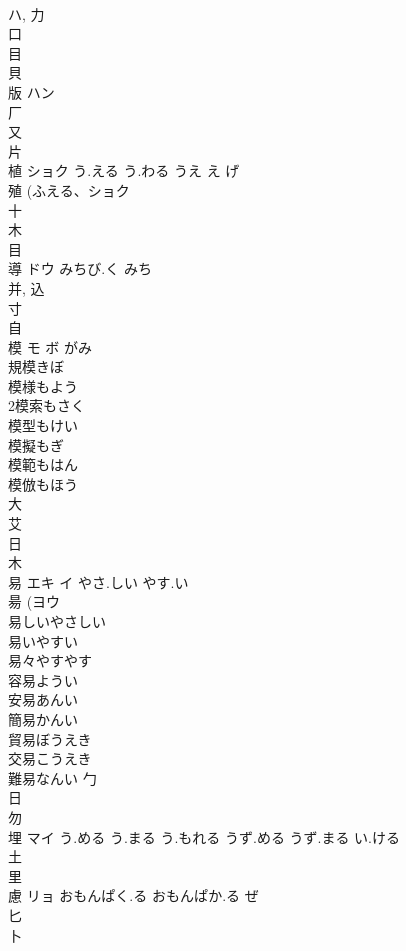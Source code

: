 \documentclass[8pt]{extreport}
\begin{document}
\begin{CJK}{UTF8}{min}
\\	ハ, 力 
\\	口 
\\	目 
\\	貝 
\\	版	ハン		
\\	厂 
\\	又 
\\	片 
\\	植	ショク	う.える う.わる うえ え げ	
\\	殖 (ふえる、ショク 
\\	十 
\\	木 
\\	目 
\\	導	ドウ	みちび.く みち	
\\	并, 込 
\\	寸 
\\	自 
\\	模	モ ボ	がみ	
\\	規模きぼ
\\	模様もよう
\\	2模索もさく
\\	模型もけい
\\	模擬もぎ
\\	模範もはん
\\	模倣もほう
\\	大 
\\	艾 
\\	日 
\\	木 
\\	易	エキ イ	やさ.しい やす.い	
\\	昜 (ヨウ 
\\	易しいやさしい 
\\	易いやすい 
\\	易々やすやす 
\\	容易ようい 
\\	安易あんい 
\\	簡易かんい 
\\	貿易ぼうえき 
\\	交易こうえき 
\\	難易なんい	勹 
\\	日 
\\	勿 
\\	埋	マイ	う.める う.まる う.もれる うず.める うず.まる い.ける	
\\	土 
\\	里 
\\	慮	リョ	おもんぱく.る おもんぱか.る ぜ	
\\	匕 
\\	卜 

\end{CJK}
\end{document}
